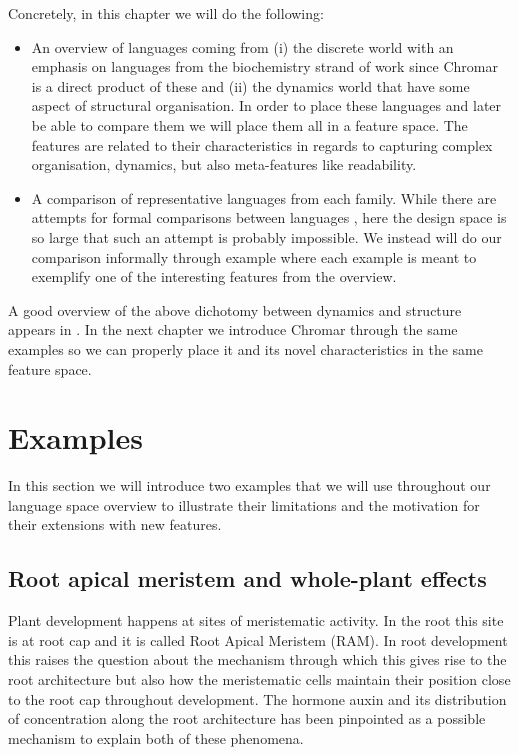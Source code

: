 \documentclass[phd]{infthesis}
\begin{document}
Concretely, in this chapter we will do the following:
\begin{itemize}
\item An overview of languages coming from (i) the discrete world with an
emphasis on languages from the biochemistry strand of work since Chromar is a
direct product of these and (ii) the dynamics world that have some aspect of
structural organisation. In order to place these languages and later be able to
compare them we will place them all in a feature space. The features are related
to their characteristics in regards to capturing complex organisation, dynamics,
but also meta-features like readability.
\item A comparison of representative languages from each family. While there are
attempts for formal comparisons between languages
\citep{felleisen1991expressive}, here the design space is so large that such an
attempt is probably impossible. We instead will do our comparison informally
through example where each example is meant to exemplify one of the interesting
features from the overview.
\end{itemize}
A good overview of the above dichotomy between dynamics and structure appears in
\citet{fontana1996barrier}.
In the next chapter  we introduce Chromar through the same examples so we can
properly place it and its novel characteristics in the same feature space.


\section{Examples}
In this section we will introduce two examples that we will use throughout our
language space overview to illustrate their limitations and the motivation
for their extensions with new features.

\subsection{Root apical meristem and whole-plant effects}
\label{sec:rootDev}
Plant development happens at sites of meristematic activity. In the root this
site is at root cap and it is called Root Apical Meristem (RAM). In root
development this raises the question about the mechanism through which this gives
rise to the root architecture but also how the meristematic cells maintain their
position close to the root cap throughout development. The hormone auxin and its
distribution of concentration along the root architecture has been pinpointed as
a possible mechanism to explain both of these phenomena.
\end{document}
